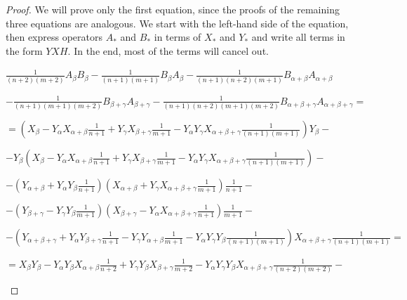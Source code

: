 \documentclass[twoside,a4paper,12pt]{article}
\theoremstyle{definition}
\newcommand{\ds}{\displaystyle}
\begin{document}
\begin{proof}
	We will prove only the first equation, since the proofs of the remaining
	three equations are analogous.
	We start with the left-hand side of the equation, then express operators
	$A_*$ and $B_*$ in terms of $X_*$ and $Y_*$ and write all terms in the
	form $YXH$. In the end, most of the terms will cancel out.
	\begin{flushleft}
		$\ds \frac1{(n+2)(m+2)}A_\beta B_\beta
		-\frac1{(n+1)(m+1)}B_\beta A_\beta
		-\frac1{(n+1)(n+2)(m+1)}B_{\alpha+\beta}A_{\alpha+\beta}$
	\end{flushleft}
	\begin{flushright}
		$\ds -\frac1{(n+1)(m+1)(m+2)}B_{\beta+\gamma}A_{\beta+\gamma}
		-\frac1{(n+1)(n+2)(m+1)(m+2)}
		B_{\alpha+\beta+\gamma}A_{\alpha+\beta+\gamma}=$
	\end{flushright}
	\begin{flushleft}
		$\ds =\left(X_\beta-Y_\alpha X_{\alpha+\beta}\frac1{n+1}+
		Y_\gamma X_{\beta+\gamma}\frac1{m+1}-Y_\alpha Y_\gamma
		X_{\alpha+\beta+\gamma}\frac1{(n+1)(m+1)}\right)Y_\beta-$
	\end{flushleft}
	\begin{flushright}
		$\ds -Y_\beta\left(X_\beta-Y_\alpha X_{\alpha+\beta}\frac1{n+1}+
		Y_\gamma X_{\beta+\gamma}\frac1{m+1}-Y_\alpha Y_\gamma
		X_{\alpha+\beta+\gamma}\frac1{(n+1)(m+1)}\right)-$
	\end{flushright}
	\begin{flushright}
		$\ds -\left(Y_{\alpha+\beta}+Y_\alpha Y_\beta\frac1{n+1}\right)
		\left(X_{\alpha+\beta}+Y_\gamma X_{\alpha+\beta+\gamma}
		\frac1{m+1}\right)\frac1{n+1}-$
	\end{flushright}
	\begin{flushright}
		$\ds -\left(Y_{\beta+\gamma}-Y_\gamma Y_\beta\frac1{m+1}\right)
		\left(X_{\beta+\gamma}-Y_\alpha X_{\alpha+\beta+\gamma}
		\frac1{n+1}\right)\frac1{m+1}-$
	\end{flushright}
	\begin{flushright}
		$\ds -\left(Y_{\alpha+\beta+\gamma}+
		Y_\alpha Y_{\beta+\gamma}\frac1{n+1}-Y_\gamma Y_{\alpha+\beta}
		\frac1{m+1}-Y_\alpha Y_\gamma Y_\beta\frac1{(n+1)(m+1)}\right)
		X_{\alpha+\beta+\gamma}\frac1{(n+1)(m+1)}=$
	\end{flushright}
	\begin{flushleft}
		$\ds =X_\beta Y_\beta-Y_\alpha Y_\beta X_{\alpha+\beta}\frac1{n+2}+
		Y_\gamma Y_\beta X_{\beta+\gamma}\frac1{m+2}-Y_\alpha Y_\gamma Y_\beta
		X_{\alpha+\beta+\gamma}\frac1{(n+2)(m+2)}-$

\end{flushleft}
\end{proof}
\end{document}
